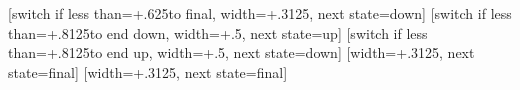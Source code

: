 {%
  [switch if less than=+.625\pgfdecorationsegmentlength to final,
                  width=+.3125\pgfdecorationsegmentlength,
                  next state=down]
  {
    \pgfpathcurveto
    {\pgfqpoint{.125\pgfdecorationsegmentlength}{0pt}}
    {\pgfqpoint{.1875\pgfdecorationsegmentlength}{\pgfdecorationsegmentamplitude}}
    {\pgfqpoint{.3125\pgfdecorationsegmentlength}{\pgfdecorationsegmentamplitude}}
  }%
  [switch if less than=+.8125\pgfdecorationsegmentlength to end down,
               width=+.5\pgfdecorationsegmentlength,
               next state=up]
  {
    \pgfpathcosine{\pgfqpoint{.25\pgfdecorationsegmentlength}{-1\pgfdecorationsegmentamplitude}}
    \pgfpathsine{\pgfqpoint{.25\pgfdecorationsegmentlength}{-1\pgfdecorationsegmentamplitude}}
  }%
  [switch if less than=+.8125\pgfdecorationsegmentlength to end up,
             width=+.5\pgfdecorationsegmentlength,
             next state=down]
  {
    \pgfpathcosine{\pgfqpoint{.25\pgfdecorationsegmentlength}{\pgfdecorationsegmentamplitude}}
    \pgfpathsine{\pgfqpoint{.25\pgfdecorationsegmentlength}{\pgfdecorationsegmentamplitude}}
  }%
  [width=+.3125\pgfdecorationsegmentlength,
                   next state=final]
  {
    \pgfpathcurveto
    {\pgfqpoint{.125\pgfdecorationsegmentlength}{\pgfdecorationsegmentamplitude}}
    {\pgfqpoint{.1875\pgfdecorationsegmentlength}{0pt}}
    {\pgfqpoint{.3125\pgfdecorationsegmentlength}{0pt}}
  }%
  [width=+.3125\pgfdecorationsegmentlength,
                 next state=final]
  {
    \pgfpathcurveto
    {\pgfqpoint{.125\pgfdecorationsegmentlength}{-\pgfdecorationsegmentamplitude}}
    {\pgfqpoint{.1875\pgfdecorationsegmentlength}{0pt}}
    {\pgfqpoint{.3125\pgfdecorationsegmentlength}{0pt}}
  }%
  {
    \pgfpathlineto{\pgfpointdecoratedpathlast}
  }%
}%


%

